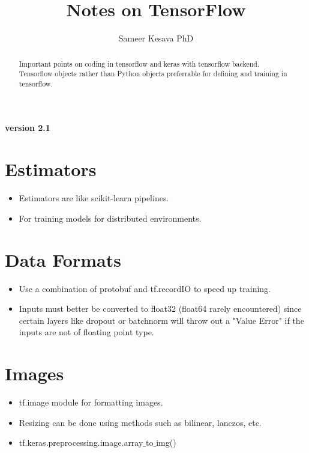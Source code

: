 \documentclass[11pt]{article}
\title{Notes on TensorFlow}
\author{Sameer Kesava PhD}
\begin{document}
\maketitle
\begin{abstract}
\noindent Important points on coding in tensorflow and keras with tensorflow backend. Tensorflow objects rather than Python objects preferrable for defining and training in tensorflow.
\end{abstract}





\begin{multicols*}{2}

\paragraph{version 2.1 \label{version}}
\section{Estimators}
\begin{itemize}
\item Estimators are like scikit-learn pipelines.
\item For training models for distributed environments.
\end{itemize}

\section{Data Formats}
\begin{itemize}
\item Use a combination of protobuf and tf.recordIO to speed up training.
\item Inputs must better be converted to float32 (float64 rarely encountered) since certain layers like dropout or batchnorm will throw out a "Value Error" if the inputs are not of floating point type.
\end{itemize}

\section{Images}
\begin{itemize}
\item tf.image module for formatting images.
\item Resizing can be done using methods such as bilinear, lanczos, etc.
\item tf.keras.preprocessing.image.array$\_$to$\_$img()
\end{itemize}


\end{multicols*}
\end{document}
